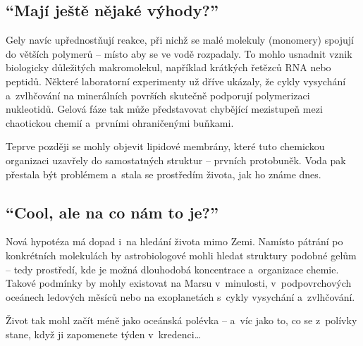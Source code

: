 \documentclass[main.tex]{subfiles}
\begin{document}
\subsection*{\enquote{Mají ještě nějaké výhody?}}
Gely navíc upřednostňují reakce, při nichž se malé molekuly (monomery) spojují do větších polymerů – místo aby se ve vodě rozpadaly. To mohlo usnadnit vznik biologicky důležitých makromolekul, například krátkých řetězců RNA nebo peptidů. Některé laboratorní experimenty už dříve ukázaly, že cykly vysychání a~zvlhčování na minerálních površích skutečně podporují polymerizaci nukleotidů. Gelová fáze tak může představovat chybějící mezistupeň mezi chaotickou chemií a~prvními ohraničenými buňkami.\par
Teprve později se mohly objevit lipidové membrány, které tuto chemickou organizaci uzavřely do samostatných struktur – prvních protobuněk. Voda pak přestala být problémem a~stala se prostředím života, jak ho známe dnes.
\subsection*{\enquote{Cool, ale na co nám to je?}}
Nová hypotéza má dopad i~na hledání života mimo Zemi. Namísto pátrání po konkrétních molekulách by astrobiologové mohli hledat struktury podobné gelům – tedy prostředí, kde je možná dlouhodobá koncentrace a~organizace chemie. Takové podmínky by mohly existovat na Marsu v~minulosti, v~podpovrchových oceánech ledových měsíců nebo na exoplanetách s~cykly vysychání a~zvlhčování.\par
Život tak mohl začít méně jako oceánská polévka – a~víc jako to, co se z~polívky stane, když ji zapomenete týden v~kredenci…
\newpage
\end{document}
